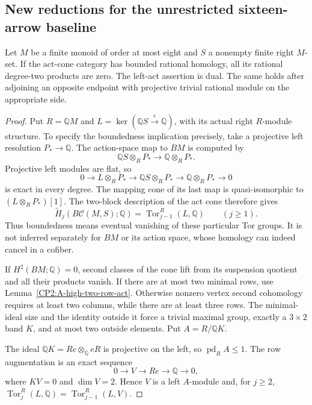 \subsection{New reductions for the unrestricted sixteen-arrow baseline}

\begin{lemma}
\label{CP2:A-baseline-eight-act}
Let $M$ be a finite monoid of order at most eight and $S$ a
nonempty finite right $M$-set.  If the act-cone category has
bounded rational homology, all its rational degree-two products
are zero.  The left-act assertion is dual.  The same holds
after adjoining an opposite endpoint with projective trivial
rational module on the appropriate side.
\end{lemma}
\begin{proof}
Put $R=\mathbb QM$ and
$L=\ker(\mathbb QS\xrightarrow{\epsilon}\mathbb Q)$,
with its actual right $R$-module structure.  To specify the
boundedness implication precisely, take a projective left
resolution $P_*\to\mathbb Q$.  The action-space map to
$BM$ is computed by
\[
 \mathbb QS\otimes_R P_*\longrightarrow
 \mathbb Q\otimes_R P_*.
\]
Projective left modules are flat, so
\[
 0\to L\otimes_RP_*\to\mathbb QS\otimes_RP_*
   \to\mathbb Q\otimes_RP_*\to0
\]
is exact in every degree.  The mapping cone of its last
map is quasi-isomorphic to $(L\otimes_RP_*)[1]$.
The two-block description of the act cone therefore gives
\[
 \widetilde H_j(B\mathcal C(M,S);\mathbb Q)
   =\operatorname{Tor}_{j-1}^R(L,\mathbb Q)
   \qquad(j\geq1).
\]
Thus boundedness means eventual vanishing of these particular
Tor groups.  It is not inferred separately for $BM$ or its
action space, whose homology can indeed cancel in a cofiber.

If $H^2(BM;\mathbb Q)=0$, second classes of the cone lift
from its suspension quotient and all their products vanish.
If there are at most two minimal rows, use
Lemma~\ref{CP2:A-high-two-row-act}.  Otherwise nonzero
vertex second cohomology requires at least two columns,
while there are at least three rows.  The minimal-ideal
size and the identity outside it force a trivial maximal
group, exactly a $3\times2$ band $K$, and at most two
outside elements.  Put $A=R/\mathbb QK$.

The ideal $\mathbb QK=Re\otimes_{\mathbb Q}eR$ is
projective on the left, so $\operatorname{pd}_R A\leq1$.
The row augmentation is an exact sequence
\[
 0\to V\to Re\to\mathbb Q\to0,
\]
where $KV=0$ and $\dim V=2$.  Hence $V$ is a left
$A$-module and, for $j\geq2$,
$\operatorname{Tor}_{j}^R(L,\mathbb Q)
=\operatorname{Tor}_{j-1}^R(L,V)$.


\end{proof}

